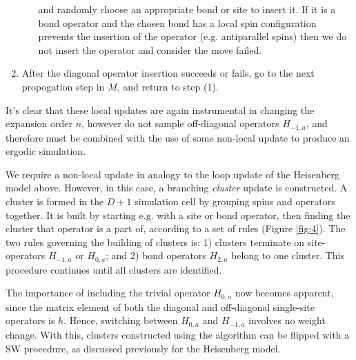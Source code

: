 \documentclass[vecphys]{svmult}
\begin{document}
\begin{enumerate}
\begin{enumerate}
\begin{equation}
\end{equation}
and randomly choose an appropriate bond or site to insert it.
If it is a bond operator and the chosen bond has a local spin configuration prevents the insertion of the operator (e.g. antiparallel spins) then we do not insert the operator and consider the move failed.
\end{enumerate}
\item After the diagonal operator insertion succeeds or fails,  go to the next propogation step in $M$, and return to step (1).
\end{enumerate}
It's clear that these local updates are again instrumental in changing the expansion order $n$, however do not sample off-diagonal operators $H_{-1,a}$, and therefore must be combined with the use of some non-local update to produce an ergodic simulation.

We require a non-local update in analogy to the loop update of the Heisenberg model above.  However, in this case, a branching {\it cluster} update is constructed.  A cluster is formed in the $D+1$ simulation cell by grouping spins and operators together.  It is built by starting e.g. with a site or bond operator, then finding the cluster that operator is a part of, according to a set of rules (Figure \ref{fig:4}).  The two rules governing the building of clusters is: 1) clusters terminate on site-operators $H_{-1,a}$ or $H_{0,a}$; and 2) bond operators $H_{2,a}$ belong to one cluster. This procedure continues until all clusters are identified.

The importance of including the trivial operator $H_{0,a}$ now becomes apparent, since the matrix element of both the diagonal and off-diagonal single-site operators is $h$.  Hence, switching between $H_{0,a}$ and $H_{-1,a}$ involves no weight change.  With this, clusters constructed using the algorithm can be flipped with a SW procedure, as discussed previously for the Heisenberg model.
\end{document}
